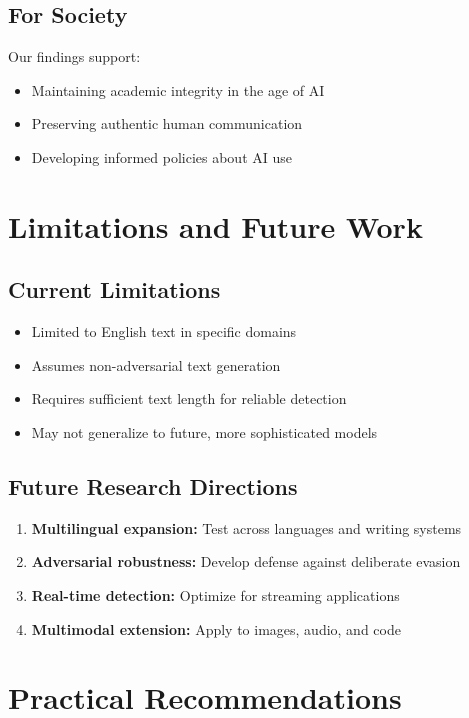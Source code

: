 \documentclass[12pt,a4paper]{report}
\begin{document}
\subsection{For Society}

Our findings support:
\begin{itemize}
    \item Maintaining academic integrity in the age of AI
    \item Preserving authentic human communication
    \item Developing informed policies about AI use
\end{itemize}

\section{Limitations and Future Work}

\subsection{Current Limitations}

\begin{itemize}
    \item Limited to English text in specific domains
    \item Assumes non-adversarial text generation
    \item Requires sufficient text length for reliable detection
    \item May not generalize to future, more sophisticated models
\end{itemize}

\subsection{Future Research Directions}

\begin{enumerate}
    \item \textbf{Multilingual expansion:} Test across languages and writing systems
    \item \textbf{Adversarial robustness:} Develop defense against deliberate evasion
    \item \textbf{Real-time detection:} Optimize for streaming applications
    \item \textbf{Multimodal extension:} Apply to images, audio, and code
\end{enumerate}

\section{Practical Recommendations}
\end{document}
